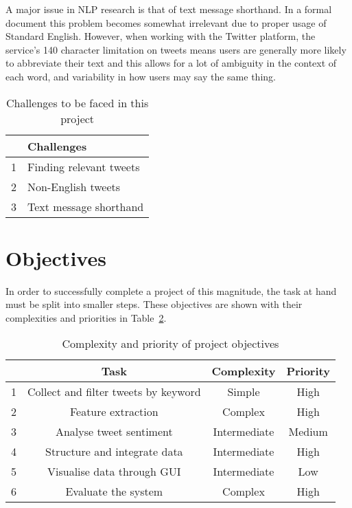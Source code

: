 A major issue in NLP research is that of text message shorthand. In a formal document this problem becomes somewhat irrelevant due to proper usage of Standard English. However, when working with the Twitter platform, the service's 140 character limitation on tweets means users are generally more likely to abbreviate their text and this allows for a lot of ambiguity in the context of each word, and variability in how users may say the same thing.


\begin{table}
\begin{center}
\begin{tabular}{|r|l|}\hline\hline
&Challenges\\\hline
1&Finding relevant tweets\\
2&Non-English tweets\\
3&Text message shorthand\\\hline\hline
\end{tabular}
\end{center}
\caption{Challenges to be faced in this project}\label{challenges}
\end{table}

\section{Objectives}
In order to successfully complete a project of this magnitude, the task at hand must be split into smaller steps.  These objectives are shown with their complexities and priorities in Table~\ref{objectives}.

\begin{table}
\begin{center}
\begin{tabular}{|r|c|c|c|}\hline\hline
&Task&Complexity&Priority\\\hline
1&Collect and filter tweets by keyword&Simple&High\\
2&Feature extraction&Complex&High\\
3&Analyse tweet sentiment&Intermediate&Medium\\
4&Structure and integrate data&Intermediate&High\\
5&Visualise data through GUI&Intermediate&Low\\
6&Evaluate the system&Complex&High\\\hline\hline
\end{tabular}
\end{center}
\caption{Complexity and priority of project objectives}\label{objectives}
\end{table}

